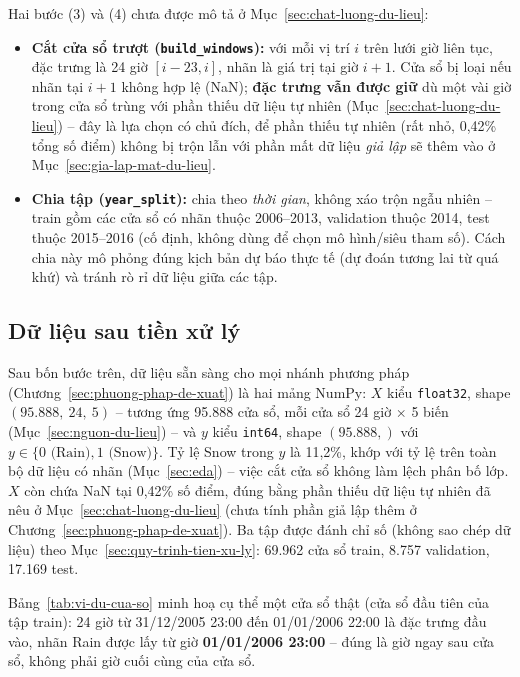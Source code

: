 Hai bước (3) và (4) chưa được mô tả ở Mục~\ref{sec:chat-luong-du-lieu}:

\begin{itemize}
  \item \textbf{Cắt cửa sổ trượt (\texttt{build\_windows}):} với mỗi vị trí $i$ trên lưới
        giờ liên tục, đặc trưng là 24 giờ $[i-23, i]$, nhãn là giá trị tại giờ $i+1$.
        Cửa sổ bị loại nếu nhãn tại $i+1$ không hợp lệ (NaN); \textbf{đặc trưng vẫn được
        giữ} dù một vài giờ trong cửa sổ trùng với phần thiếu dữ liệu tự nhiên
        (Mục~\ref{sec:chat-luong-du-lieu}) -- đây là lựa chọn có chủ đích, để phần thiếu
        tự nhiên (rất nhỏ, 0,42\% tổng số điểm) không bị trộn lẫn với phần mất dữ liệu
        \emph{giả lập} sẽ thêm vào ở Mục~\ref{sec:gia-lap-mat-du-lieu}.
  \item \textbf{Chia tập (\texttt{year\_split}):} chia theo \emph{thời gian}, không xáo
        trộn ngẫu nhiên -- train gồm các cửa sổ có nhãn thuộc 2006--2013, validation thuộc
        2014, test thuộc 2015--2016 (cố định, không dùng để chọn mô hình/siêu tham số).
        Cách chia này mô phỏng đúng kịch bản dự báo thực tế (dự đoán tương lai từ quá khứ)
        và tránh rò rỉ dữ liệu giữa các tập.
\end{itemize}

\subsection{Dữ liệu sau tiền xử lý}
\label{sec:du-lieu-sau-tien-xu-ly}

Sau bốn bước trên, dữ liệu sẵn sàng cho mọi nhánh phương pháp (Chương~\ref{sec:phuong-phap-de-xuat})
là hai mảng NumPy: $X$ kiểu \texttt{float32}, shape $(95{.}888,\ 24,\ 5)$ -- tương ứng
95.888 cửa sổ, mỗi cửa sổ 24 giờ $\times$ 5 biến (Mục~\ref{sec:nguon-du-lieu}) -- và $y$
kiểu \texttt{int64}, shape $(95{.}888,)$ với $y \in \{0 \text{ (Rain)}, 1 \text{ (Snow)}\}$.
Tỷ lệ Snow trong $y$ là 11,2\%, khớp với tỷ lệ trên toàn bộ dữ liệu có nhãn
(Mục~\ref{sec:eda}) -- việc cắt cửa sổ không làm lệch phân bố lớp. $X$ còn chứa NaN tại
0,42\% số điểm, đúng bằng phần thiếu dữ liệu tự nhiên đã nêu ở
Mục~\ref{sec:chat-luong-du-lieu} (chưa tính phần giả lập thêm ở Chương~\ref{sec:phuong-phap-de-xuat}).
Ba tập được đánh chỉ số (không sao chép dữ liệu) theo Mục~\ref{sec:quy-trinh-tien-xu-ly}:
69.962 cửa sổ train, 8.757 validation, 17.169 test.

Bảng~\ref{tab:vi-du-cua-so} minh hoạ cụ thể một cửa sổ thật (cửa sổ đầu tiên của tập
train): 24 giờ từ 31/12/2005 23:00 đến 01/01/2006 22:00 là đặc trưng đầu vào, nhãn
Rain được lấy từ giờ \textbf{01/01/2006 23:00} -- đúng là giờ ngay sau cửa sổ, không phải
giờ cuối cùng của cửa sổ.

